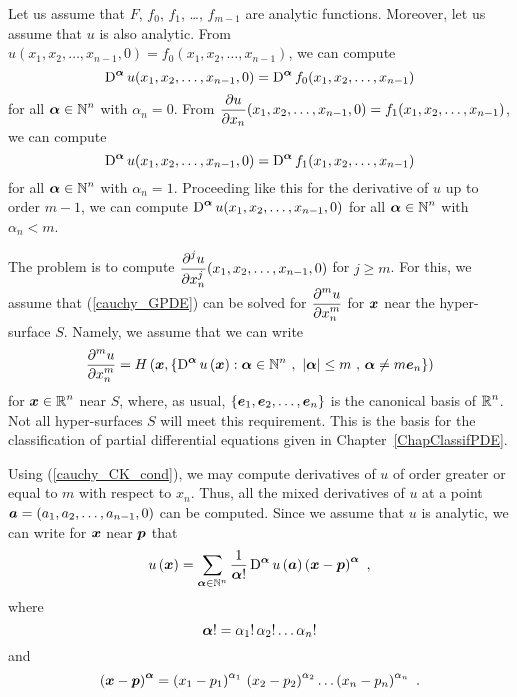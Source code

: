 Let us assume that $F$, $f_0$, $f_1$, \ldots , $f_{m-1}$ are analytic
functions.  Moreover, let us assume that $u$ is also analytic.
From $u(x_1,x_2, \ldots, x_{n-1},0) = f_0(x_1,x_2, \ldots, x_{n-1})$,
we can compute
\[
\operatorname{D}^{{\bm{\alpha}}} u(x_1, x_2, \ldots, x_{n-1}, 0) =
\operatorname{D}^{{\bm{\alpha}}} f_0(x_1, x_2, \ldots, x_{n-1})
\]
for all $\displaystyle {\bm{\alpha}} \in \mathbb{N}^n$ with $\alpha_n = 0$.
From $\displaystyle \frac{\partial{u}}{\partial x_n}(x_1,x_2, \ldots, x_{n-1},0)
= f_1(x_1,x_2, \ldots, x_{n-1})$,
we can compute
\[
\operatorname{D}^{{\bm{\alpha}}} u(x_1, x_2, \ldots, x_{n-1}, 0) =
\operatorname{D}^{{\bm{\alpha}}} f_1(x_1, x_2, \ldots, x_{n-1})
\]
for all $\displaystyle {\bm{\alpha}} \in \mathbb{N}^n$ with $\alpha_n = 1$.
Proceeding like this for the derivative of $u$ up to order $m-1$, we
can compute
$\displaystyle \operatorname{D}^{{\bm{\alpha}}} u(x_1, x_2, \ldots, x_{n-1}, 0)$ for
all $\displaystyle {\bm{\alpha}} \in \mathbb{N}^n$ with $\alpha_n < m$.

The problem is to compute
$\displaystyle \frac{\displaystyle \partial^{j}{u}} {\displaystyle \partial x_n^{j}}(x_1,x_2,\ldots,x_{n-1},0)$ for $j\geq m$.
For this, we assume that (\ref{cauchy_GPDE}) can be solved for
$\displaystyle \frac{\displaystyle \partial^{m}{u}} {\displaystyle \partial x_n^{m}}$ for ${\bm{x}}$ near the hyper-surface $S$.
Namely, we assume that we can write
\begin{equation} \label{cauchy_CK_cond}
\displaystyle \pdydxn{u}{x_n}{m} = H\left(\VEC{x},
\left\{ \diff^{\VEC{\alpha}} u\left(\VEC{x}\right) :
\VEC{\alpha} \in \NN^n \ , \ 
|\VEC{\alpha}| \leq m \ , \, \VEC{\alpha} \neq m \VEC{e}_n \right\} \right)
\end{equation}
for $\displaystyle {\bm{x}} \in \mathbb{R}^n$ near $S$, where, as usual,
$\displaystyle \left\{ {\bm{e}}_1, {\bm{e}}_2, \ldots, {\bm{e}}_n\right\}$ 
is the canonical basis of $\displaystyle \mathbb{R}^n$.  Not all
hyper-surfaces $S$ will meet this requirement.   This is the basis for
the classification of partial differential equations given in
Chapter~\ref{ChapClassifPDE}.

Using (\ref{cauchy_CK_cond}), we may compute derivatives of $u$ of
order greater or equal to $m$ with respect to $x_n$.  Thus, all the
mixed derivatives of $u$ at a point
${\bm{a}} = (a_1,a_2, \ldots, a_{n-1}, 0)$
can be computed.  Since we assume that $u$ is analytic, we can write
for ${\bm{x}}$ near ${\bm{p}}$ that
\[
u\left({\bm{x}}\right) =
\sum_{{\bm{\alpha}} \in \mathbb{N}^n} \frac{1}{{\bm{\alpha}}!}
\operatorname{D}^{{\bm{\alpha}}} u\left({\bm{a}}\right)
\left( {\bm{x}}- {\bm{p}} \right)^{{\bm{\alpha}}} \ ,
\]
where
\[
{\bm{\alpha}}! = \alpha_1!\,\alpha_2!\ldots \alpha_n!
\]
and
\[
\left( {\bm{x}}- {\bm{p}} \right)^{{\bm{\alpha}}} =
\left(x_1-p_1\right)^{\alpha_1}\,\left(x_2-p_2\right)^{\alpha_2}\ldots
\left(x_n-p_n\right)^{\alpha_n} \ .
\]

